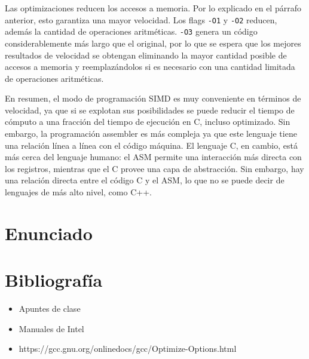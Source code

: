 \documentclass[a4paper]{article}
\begin{document}
Las optimizaciones reducen los accesos a memoria. Por lo explicado en el párrafo anterior, esto garantiza una mayor velocidad. Los flags \texttt{-O1} y \texttt{-O2} reducen, además la cantidad de operaciones aritméticas. \texttt{-O3} genera un código considerablemente más largo que el original, por lo que se espera que los mejores resultados de velocidad se obtengan eliminando la mayor cantidad posible de accesos a memoria y reemplazándolos si es necesario con una cantidad limitada de operaciones aritméticas.

En resumen, el modo de programación SIMD es muy conveniente en términos de velocidad, ya que si se explotan sus posibilidades se puede reducir el tiempo de cómputo a una fracción del tiempo de ejecución en C, incluso optimizado. Sin embargo, la programación assembler es más compleja ya que este lenguaje tiene una relación línea a línea con el código máquina. El lenguaje C, en cambio, está más cerca del lenguaje humano: el ASM permite una interacción más directa con los registros, mientras que el C provee una capa de abstracción. Sin embargo, hay una relación directa entre el código C y el ASM, lo que no se puede decir de lenguajes de más alto nivel, como C++.

\newpage 
\section{Enunciado}


\section{Bibliografía}
\begin{itemize}
\item Apuntes de clase
\item Manuales de Intel
\item https://gcc.gnu.org/onlinedocs/gcc/Optimize-Options.html
\end{itemize}
\end{document}
